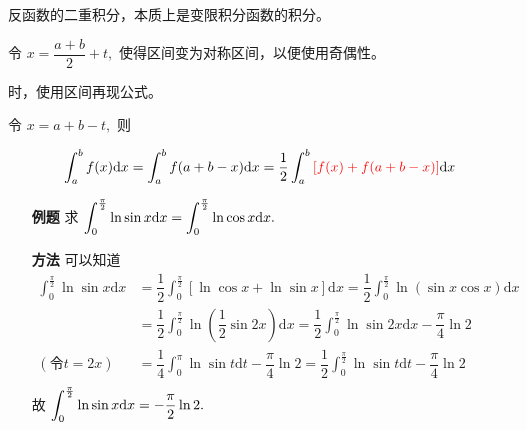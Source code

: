 反函数的二重积分，本质上是变限积分函数的积分。


令 $ x = \dfrac{a+b}{2} + t, $ 使得区间变为对称区间，以便使用奇偶性。


时，使用区间再现公式。

令 $ x = a + b - t, $ 则

$$
    \int_a^bf(x)\mathrm{d}x = \int_a^bf(a+b-x)\mathrm{d}x = 
    \dfrac{1}{2}\int_a^b\textcolor{red}{[f(x)+f(a+b-x)]}\mathrm{d}x
$$

\begin{enumerate}
    \item[\textbf{例题}] 求 $ \displaystyle \displaystyle \int_0^\frac{\pi}{2} \ln \sin x \mathrm{d}x = 
    \displaystyle \int_0^\frac{\pi}{2} \ln \cos x \mathrm{d}x. $ 
    \item[\textbf{方法}] 可以知道 \begin{equation*}
        \begin{aligned}
            \int_0^\frac{\pi}{2}\ln\sin x \mathrm{d}x &= 
            \dfrac{1}{2}\int_0^\frac{\pi}{2}[\ln \cos x + \ln\sin x] \mathrm{d}x 
            = \dfrac{1}{2}\int_0^\frac{\pi}{2}\ln \left(\sin x\cos x\right) \mathrm{d}x \\ 
            &= \dfrac{1}{2}\int_0^\frac{\pi}{2}\ln \left(\dfrac{1}{2}\sin 2x\right)\mathrm{d}x 
            = \dfrac{1}{2}\int_0^\frac{\pi}{2}\ln \sin 2x\mathrm{d}x - \dfrac{\pi}{4}\ln 2 \\ 
            (\textrm{令}t = 2x)&= \dfrac{1}{4}\int_0^\pi\ln \sin t\mathrm{d}t - \dfrac{\pi}{4}\ln 2 
            = \dfrac{1}{2}\int_0^\frac{\pi}{2}\ln \sin t\mathrm{d}t - \dfrac{\pi}{4}\ln 2 \\ 
        \end{aligned}
    \end{equation*}
    故 $ \displaystyle \int_0^\frac{\pi}{2}\ln\sin x \mathrm{d}x = -\dfrac{\pi}{2}\ln 2. $ 
\end{enumerate}

